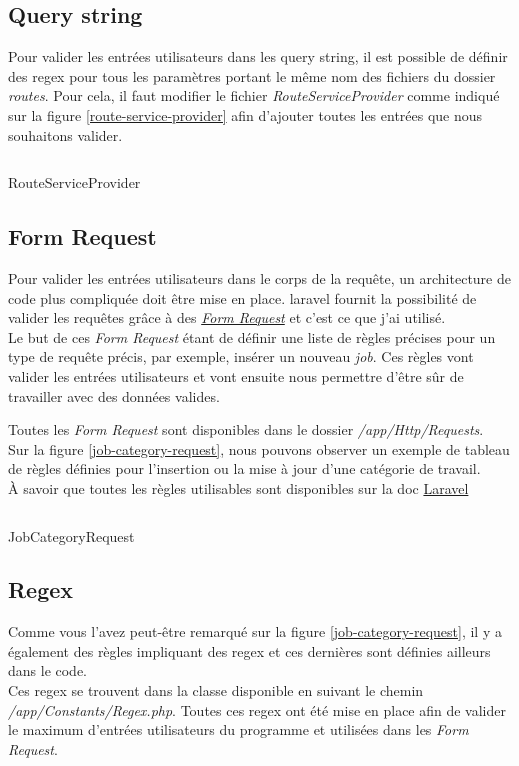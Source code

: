 \documentclass[
    iai, %
    il, %
]{heig-tb}
\begin{document}
\subsection{Query string}
Pour valider les entrées utilisateurs dans les query string, il est possible de définir des \Gls{regex} pour tous les paramètres portant le même nom des fichiers du dossier \emph{routes}.
Pour cela, il faut modifier le fichier \emph{RouteServiceProvider} comme indiqué sur la figure \ref{route-service-provider} afin d'ajouter toutes les entrées que nous souhaitons valider.

\begin{listing}[h]
    \inputminted{php}{assets/code/RouteServiceProvider.php}
    \caption{RouteServiceProvider \label{route-service-provider}}
\end{listing}

\subsection{Form Request}
Pour valider les entrées utilisateurs dans le corps de la requête, un architecture de code plus compliquée doit être mise en place. \Gls{laravel} fournit la possibilité de valider les requêtes grâce à des \href{https://laravel.com/docs/9.x/validation#form-request-validation}{\emph{Form Request}} et c'est ce que j'ai utilisé. \\
Le but de ces \emph{Form Request} étant de définir une liste de règles précises pour un type de requête précis, par exemple, insérer un nouveau \emph{job}. Ces règles vont valider les entrées utilisateurs et vont ensuite nous permettre d'être sûr de travailler avec des données valides.

Toutes les \emph{Form Request} sont disponibles dans le dossier \emph{/app/Http/Requests}. \\
Sur la figure \ref{job-category-request}, nous pouvons observer un exemple de tableau de règles définies pour l'insertion ou la mise à jour d'une catégorie de travail. \\
À savoir que toutes les règles utilisables sont disponibles sur la doc \href{https://laravel.com/docs/9.x/validation#available-validation-rules}{Laravel}

\begin{listing}[h]
    \inputminted{php}{assets/code/JobCategoryRequest.php}
    \caption{JobCategoryRequest \label{job-category-request}}
\end{listing}

\subsection{Regex}
Comme vous l'avez peut-être remarqué sur la figure \ref{job-category-request}, il y a également des règles impliquant des \Gls{regex} et ces dernières sont définies ailleurs dans le code. \\
Ces \Gls{regex} se trouvent dans la classe disponible en suivant le chemin \emph{/app/Constants/Regex.php}. Toutes ces \Gls{regex} ont été mise en place afin de valider le maximum d'entrées utilisateurs du programme et utilisées dans les \emph{Form Request}.
\end{document}
